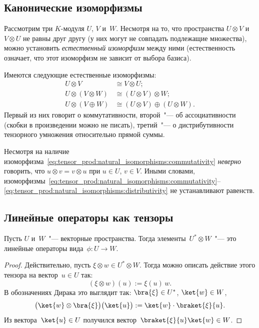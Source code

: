 \subsection{Канонические изоморфизмы}

Рассмотрим три $K$-модуля $U$, $V$ и~$W$. Несмотря на то, что пространства $U \otimes V$ и $V \otimes U$ не равны друг другу (у них могут не совпадать подлежащие множества), можно установить \emph{естественный изоморфизм} между ними (естественность означает, что этот изоморфизм не зависит от выбора базиса).

Имеются следующие естественные изоморфизмы:
\begin{align}
	U \otimes V
	&\cong
	V \otimes U;
	\label{eq:tensor_prod:natural_isomorphisms:commutativity}
	\\
	U \otimes (V \otimes W)
	&\cong
	(U \otimes V) \otimes W;
	\label{eq:tensor_prod:natural_isomorphisms:associativity}
	\\
	U \otimes (V \oplus W)
	&\cong
	(U \otimes V) \oplus 
	(U \otimes W).
	\label{eq:tensor_prod:natural_isomorphisms:distributivity}
\end{align}
Первый из них говорит о коммутативности, второй~"--- об ассоциативности (скобки в произведении можно не писать), третий~"--- о дистрибутивности тензорного умножения относительно прямой суммы.

\begin{remark}
	Несмотря на наличие изоморфизма~\eqref{eq:tensor_prod:natural_isomorphisms:commutativity} \emph{неверно} говорить, что $u \otimes v = v \otimes u$ при $u \in U$, $v \in V$.
	Иными словами, изоморфизмы~\eqref{eq:tensor_prod:natural_isomorphisms:commutativity}--\eqref{eq:tensor_prod:natural_isomorphisms:distributivity} не устанавливают равенств.
\end{remark}


\subsection{Линейные операторы как тензоры}

\begin{lemma}
	Пусть $U$ и~$W$~"--- векторные пространства. Тогда элементы~$U^* \otimes W$~"--- это линейные операторы вида~$\phi \colon U \to W$.
\end{lemma}
\begin{proof}
	Действительно, пусть $\xi \otimes w \in U^* \otimes W$. Тогда можно описать действие этого тензора на вектор~$u \in U$ так:
	\[
		(\xi \otimes w)(u) :=
		\xi(u)\,w.
	\]
	В обозначениях Дирака это выглядит так:
	$\bra{\xi} \in U^*$, $\ket{w} \in W$,
	\[
		\bigl(
			\ket{w} \otimes \bra{\xi}
		\bigr)
		\bigl(
			\ket{u}
		\bigr) :=
		\ket{w} \cdot \braket{\xi}{u}
		.
	\]
	Из вектора~$\ket{u} \in U$ получился вектор~$\braket{\xi}{u} \ket{w} \in W$.
\end{proof}

